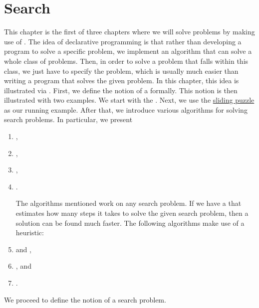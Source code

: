 \chapter{Search}
This chapter is the first of three chapters where we will solve problems by making use of
. 
The idea of declarative programming is that rather than developing a program to solve a specific problem,
we implement an algorithm that can solve a whole class of problems.  Then, in order to solve a problem that
falls within this class, we just have to specify the problem, which is usually much easier than writing a
program that solves the given problem.  In this chapter, this idea is illustrated via .
First, we define the notion of a  formally.  This notion is then illustrated with two
examples.  We start with the .  Next, we use the 
\href{https://en.wikipedia.org/wiki/15_puzzle}{sliding puzzle} as our running example. 
After that, we introduce various algorithms for solving search problems.  In particular, we present
\begin{enumerate}
\item {},
\item {},
\item {},
\item {}.

      The algorithms mentioned work on any search problem.  If we have a  that estimates how many steps
      it takes to solve the given search problem, then a solution can be found much faster.
      The following algorithms make use of a heuristic:
      
\item {} and ,
\item {}, and
\item {}.
\end{enumerate}
We proceed to define the notion of a search problem.

